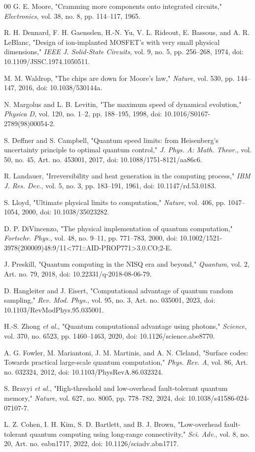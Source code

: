 \documentclass[conference]{IEEEtran}
\begin{document}
\begin{thebibliography}{00}
G. E. Moore, "Cramming more components onto integrated circuits,"
\emph{Electronics}, vol. 38, no. 8, pp. 114--117, 1965.

R. H. Dennard, F. H. Gaensslen, H.-N. Yu, V. L. Rideout, E. Bassous, and
A. R. LeBlanc, "Design of ion-implanted MOSFET's with very small physical
dimensions," \emph{IEEE J. Solid-State Circuits}, vol. 9, no. 5,
pp. 256--268, 1974, doi: 10.1109/JSSC.1974.1050511.

M. M. Waldrop, "The chips are down for Moore's law," \emph{Nature},
vol. 530, pp. 144--147, 2016, doi: 10.1038/530144a.

N. Margolus and L. B. Levitin, "The maximum speed of dynamical evolution,"
\emph{Physica D}, vol. 120, no. 1--2, pp. 188--195, 1998,
doi: 10.1016/S0167-2789(98)00054-2.

S. Deffner and S. Campbell, "Quantum speed limits: from Heisenberg's
uncertainty principle to optimal quantum control," \emph{J. Phys. A:
Math. Theor.}, vol. 50, no. 45, Art. no. 453001, 2017,
doi: 10.1088/1751-8121/aa86c6.

R. Landauer, "Irreversibility and heat generation in the computing process,"
\emph{IBM J. Res. Dev.}, vol. 5, no. 3, pp. 183--191, 1961,
doi: 10.1147/rd.53.0183.

S. Lloyd, "Ultimate physical limits to computation," \emph{Nature},
vol. 406, pp. 1047--1054, 2000, doi: 10.1038/35023282.

D. P. DiVincenzo, "The physical implementation of quantum computation,"
\emph{Fortschr. Phys.}, vol. 48, no. 9--11, pp. 771--783, 2000,
doi: 10.1002/1521-3978(200009)48:9/11<771::AID-PROP771>3.0.CO;2-E.

J. Preskill, "Quantum computing in the NISQ era and beyond,"
\emph{Quantum}, vol. 2, Art. no. 79, 2018,
doi: 10.22331/q-2018-08-06-79.

D. Hangleiter and J. Eisert, "Computational advantage of quantum random
sampling," \emph{Rev. Mod. Phys.}, vol. 95, no. 3, Art. no. 035001, 2023,
doi: 10.1103/RevModPhys.95.035001.

H.-S. Zhong \emph{et al.}, "Quantum computational advantage using photons,"
\emph{Science}, vol. 370, no. 6523, pp. 1460--1463, 2020,
doi: 10.1126/science.abe8770.

A. G. Fowler, M. Mariantoni, J. M. Martinis, and A. N. Cleland, "Surface
codes: Towards practical large-scale quantum computation," \emph{Phys.
Rev. A}, vol. 86, Art. no. 032324, 2012,
doi: 10.1103/PhysRevA.86.032324.

S. Bravyi \emph{et al.}, "High-threshold and low-overhead fault-tolerant
quantum memory," \emph{Nature}, vol. 627, no. 8005, pp. 778--782, 2024,
doi: 10.1038/s41586-024-07107-7.

L. Z. Cohen, I. H. Kim, S. D. Bartlett, and B. J. Brown, "Low-overhead
fault-tolerant quantum computing using long-range connectivity,"
\emph{Sci. Adv.}, vol. 8, no. 20, Art. no. eabn1717, 2022,
doi: 10.1126/sciadv.abn1717.
\end{thebibliography}
\end{document}
